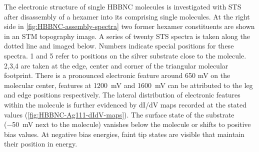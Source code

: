 The electronic structure of single HBBNC molecules is investigated with STS after disassembly of a hexamer into its comprising single molecules. At the right side in \autoref{fig:HBBNC-assembly-spectra} two former hexamer constituents are shown in an STM topography image. A series of twenty STS spectra is taken along the dotted line and imaged below. Numbers indicate special positions for these spectra. 1 and 5 refer to positions on the silver substrate close to the molecule. 2,3,4 are taken at the edge, center and corner of the triangular molecular footprint. There is a pronounced electronic feature around 650 mV on the molecular center, features at \SI{1200}{\milli \volt} and \SI{1600}{\milli \volt} can be attributed to the leg and edge positions respectively. The lateral distribution of electronic features within the molecule is further evidenced by dI/dV maps recorded at the stated values (\autoref{fig:HBBNC-Ag111-dIdV-maps}).
The surface state of the substrate (\SI{-50}{\milli \volt} next to the molecule) vanishes below the molecule or shifts to positive bias values. At negative bias energies, faint tip states are visible that maintain their position in energy. 




